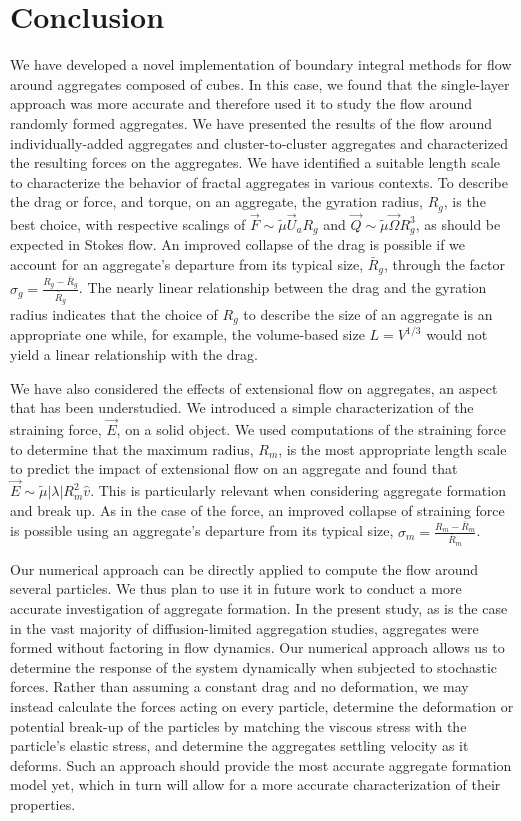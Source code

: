 \section{Conclusion}
\label{sec:conclusion}

We have developed a novel implementation of boundary integral methods for flow around aggregates composed of cubes. In this case, we found that the single-layer approach was more accurate and therefore used it to study the flow around randomly formed aggregates.
We have presented the results of the flow around individually-added aggregates and cluster-to-cluster aggregates and characterized the resulting forces on the aggregates. We have identified a suitable length scale to characterize the behavior of fractal aggregates in various contexts. To describe the drag or force, and torque, on an aggregate, the gyration radius, $R_g$, is the best choice, with respective scalings of $\vec{F} \sim \tilde{\mu} \vec{U}_a R_g$ and $\vec{Q} \sim \tilde{\mu} \vec{\Omega} R_g^3$, as should be expected in Stokes flow. 
An improved collapse of the drag is possible if we account for an aggregate's departure from its typical size, $\bar{R}_g$, through the factor $\sigma_g = \frac{R_g - \bar{R}_g}{\bar{R}_g}$. 
The nearly linear relationship between the drag and the gyration radius indicates that the choice of $R_g$ to describe the size of an aggregate is an appropriate one while, for example, the volume-based size $L=V^{1/3}$ would not yield a linear relationship with the drag.  



We have also considered the effects of extensional flow on aggregates, an aspect that has been understudied. We introduced a simple characterization of the straining force, $\vec{E}$, on a solid object. We used computations of the straining force to determine that the maximum radius, $R_m$, is the most appropriate length scale to predict the impact of extensional flow on an aggregate and found that $\vec{E} \sim \tilde{\mu} |\lambda| R_m^2 \hat{v}$. This is particularly relevant when considering aggregate formation and break up. As in the case of the force, an improved collapse
of straining force is 
possible using an aggregate's departure from its typical size, $\sigma_m = \frac{R_m - \bar{R}_m}{\bar{R}_m}$. 


Our numerical approach can be directly applied to compute the flow around several particles. We thus plan to use it in future work to conduct a more accurate investigation of aggregate formation. In the present study, as is the case in the vast majority of diffusion-limited aggregation studies, aggregates were formed without factoring in flow dynamics. Our numerical approach allows us to determine the response of the system dynamically when subjected to stochastic forces. Rather than assuming a constant drag and no deformation, we may instead calculate the forces acting on every particle, determine the deformation or potential break-up of the particles by matching the viscous stress with the particle's elastic stress, and determine the aggregates settling velocity as it deforms. Such an approach should provide the most accurate aggregate formation model yet, which in turn will allow for a more accurate characterization of their properties.

